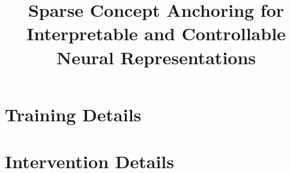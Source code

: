 \documentclass{article} %
\title{Sparse Concept Anchoring for Interpretable and Controllable Neural Representations}
\begin{document}
\maketitle

%










%




\clearpage

%
%
%

\let\Oldsubsection\subsection
\renewcommand{\subsection}{\FloatBarrier\Oldsubsection}

\appendix
{}



\section{Training Details}






\section{Intervention Details}








\end{document}
